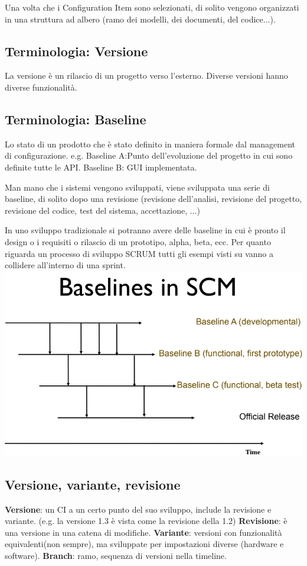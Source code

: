 \documentclass[10pt,a4paper]{book}
\begin{document}
Una volta che i Configuration Item sono selezionati, di solito vengono organizzati in una struttura ad albero (ramo dei modelli, dei documenti, del codice...).

\subsection{Terminologia: Versione}
La versione è un rilascio di un progetto verso l'esterno. Diverse versioni hanno diverse funzionalità.

\subsection{Terminologia: Baseline}
Lo stato di un prodotto che è stato definito in maniera formale dal management di configurazione.
e.g. Baseline A:Punto dell'evoluzione del progetto in cui sono definite tutte le API.
	Baseline B: GUI implementata.
	
Man mano che i sistemi vengono sviluppati, viene sviluppata una serie di baseline, di solito dopo una
revisione (revisione dell'analisi, revisione del progetto, revisione del codice, test del sistema, accettazione, ...)

In uno sviluppo tradizionale si potranno avere delle baseline in cui è pronto il design o i requisiti o rilascio di un prototipo, alpha, beta, ecc.
Per quanto riguarda un processo di sviluppo SCRUM tutti gli esempi visti su vanno a collidere all'interno di una sprint.\\
\includegraphics[scale=0.45]{baseline.png} 

\subsection{Versione, variante, revisione}
\textbf{Versione}: un CI a un certo punto del suo sviluppo, include la revisione e variante. (e.g. la versione 1.3 è vista come la revisione della 1.2)
\textbf{Revisione}: è una versione in una catena di modifiche.
\textbf{Variante}: versioni con funzionalità equivalenti(non sempre), ma sviluppate per impostazioni diverse (hardware e software).
\textbf{Branch}: ramo, sequenza di versioni nella timeline.
\end{document}
